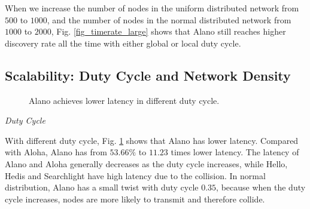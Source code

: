 When we increase the number of nodes in the uniform distributed  network from $500$ to $1000$, and the number of nodes in the normal distributed network from $1000$ to $2000$, Fig. \ref{fig_timerate_large} shows that Alano still reaches higher discovery rate all the time with either global or local duty cycle.



\subsection{Scalability: Duty Cycle and Network Density}

\begin{figure}[!h]
\centering
{}
\hspace{0.01in}
\caption{Alano achieves lower latency in different duty cycle.}
\label{fig_dutycycle}
\end{figure}

\emph{Duty Cycle} 

With different duty cycle, Fig. \ref{fig_dutycycle} shows that Alano has lower latency. Compared with Aloha, Alano has from $53.66\%$ to $11.23$ times lower latency. The latency of Alano and Aloha generally decreases as the duty cycle increases, while Hello, Hedis and Searchlight have high latency due to the collision. In normal distribution, Alano has a small twist with duty cycle $0.35$, because when the duty cycle increases, nodes are more likely to transmit and therefore collide.


